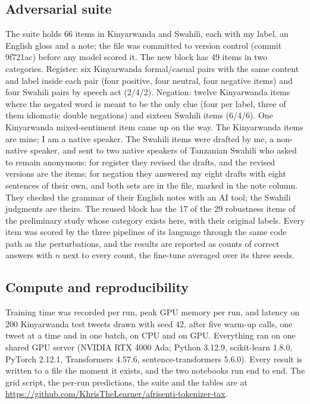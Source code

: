 \documentclass[11pt]{article}
\begin{document}
\subsection{Adversarial suite}
The suite holds 66 items in Kinyarwanda and Swahili, each with my label, an English gloss and a note; the file was committed to version control (commit 9f721ac) before any model scored it. The new block has 49 items in two categories. Register: six Kinyarwanda formal/casual pairs with the same content and label inside each pair (four positive, four neutral, four negative items) and four Swahili pairs by speech act (2/4/2). Negation: twelve Kinyarwanda items where the negated word is meant to be the only clue (four per label, three of them idiomatic double negations) and sixteen Swahili items (6/4/6). One Kinyarwanda mixed-sentiment item came up on the way. The Kinyarwanda items are mine; I am a native speaker. The Swahili items were drafted by me, a non-native speaker, and sent to two native speakers of Tanzanian Swahili who asked to remain anonymous: for register they revised the drafts, and the revised versions are the items; for negation they answered my eight drafts with eight sentences of their own, and both sets are in the file, marked in the note column. They checked the grammar of their English notes with an AI tool; the Swahili judgments are theirs. The reused block has the 17 of the 29 robustness items of the preliminary study whose category exists here, with their original labels. Every item was scored by the three pipelines of its language through the same code path as the perturbations, and the results are reported as counts of correct answers with $n$ next to every count, the fine-tune averaged over its three seeds.

\subsection{Compute and reproducibility}
Training time was recorded per run, peak GPU memory per run, and latency on 200 Kinyarwanda test tweets drawn with seed 42, after five warm-up calls, one tweet at a time and in one batch, on CPU and on GPU. Everything ran on one shared GPU server (NVIDIA RTX 4000 Ada; Python 3.12.9, scikit-learn 1.8.0, PyTorch 2.12.1, Transformers 4.57.6, sentence-transformers 5.6.0). Every result is written to a file the moment it exists, and the two notebooks run end to end. The grid script, the per-run predictions, the suite and the tables are at \url{https://github.com/KhrisTheLearner/afrisenti-tokenizer-tax}.
\end{document}
